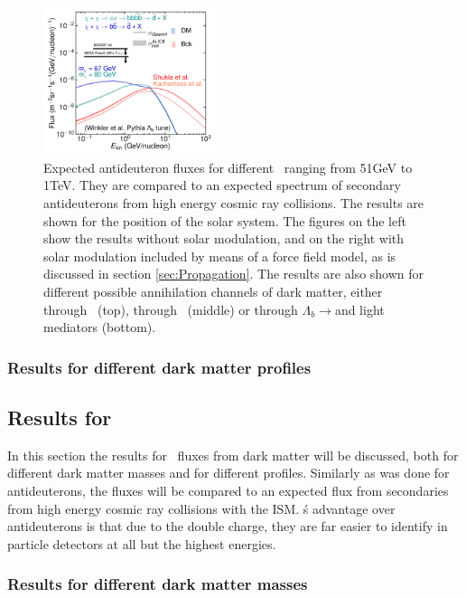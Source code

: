\begin{figure}
    \includegraphics[width=0.45\textwidth]{figures/blambdadbarPaperTOA.pdf}
    \caption{Expected antideuteron fluxes for different \dmm\ ranging from 51GeV to 1TeV. They are compared to an expected spectrum of secondary antideuterons from high energy cosmic ray collisions. The results are shown for the position of the solar system. The figures on the left show the results without solar modulation, and on the right with solar modulation included by means of a force field model, as is discussed in section \ref{sec:Propagation}. The results are also shown for different possible annihilation channels of dark matter, either through \WW\ (top), through \bb\ (middle) or through $\Lambda_b \rightarrow $\bb and light mediators (bottom).}
    \label{fig:Results_dbar_fluxes_diff_DM_masses}
\end{figure}


\subsubsection{Results for different dark matter profiles}
\subsection{Results for \ahe}
In this section the results for \ahe\ fluxes from dark matter will be discussed, both for different dark matter masses and for different profiles. Similarly as was done for antideuterons, the fluxes will be compared to an expected flux from secondaries from high energy cosmic ray collisions with the ISM. \ahe\'s advantage over antideuterons is that due to the double charge, they are far easier to identify in particle detectors at all but the highest energies.
\subsubsection{Results for different dark matter masses}

